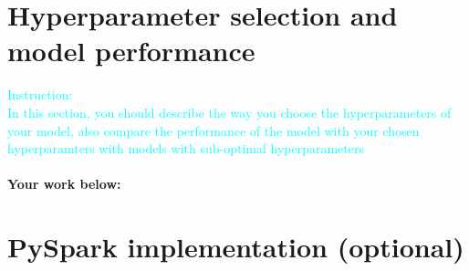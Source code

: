 \documentclass{article}
\begin{document}
\section{Hyperparameter selection and model performance}
\textcolor{cyan}{Instruction: \\
In this section, you should describe the way you choose the hyperparameters of your model, also compare the performance of the model with your chosen hyperparamters with models with sub-optimal hyperparameters}\\\\
\textbf{Your work below:}\\
\section{PySpark implementation (optional)}
\end{document}
